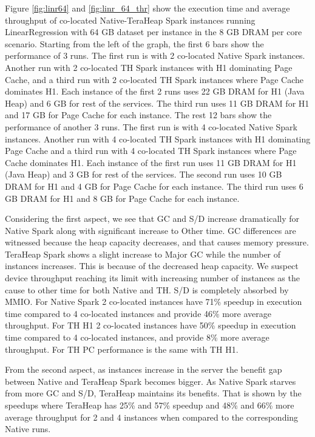 Figure \ref{fig:linr64} and \ref{fig:linr_64_thr} show the execution time and average throughput of co-located
Native-TeraHeap Spark instances running LinearRegression with 64 GB
dataset per instance in the 8 GB DRAM per core scenario.
Starting from the left of the graph, the first 6 bars show the
performance of 3 runs. The first run is with 2 co-located Native Spark instances.
Another run with 2 co-located TH Spark instances with H1 dominating Page Cache,
and a third run with 2 co-located TH Spark instances where Page Cache dominates H1.
Each instance of the first 2 runs uses 22 GB DRAM for H1 (Java Heap) and 6 GB for rest of the services.
The third run uses 11 GB DRAM for H1 and 17 GB for Page Cache for each instance.
The rest 12 bars show the performance of another 3 runs. The first run is with 4 co-located Native Spark instances.
Another run with 4 co-located TH Spark instances with H1 dominating Page Cache
and a third run with 4 co-located TH Spark instances where Page Cache dominates H1.
Each instance of the first run uses 11 GB DRAM for H1 (Java Heap) and 3 GB for rest of the services.
The second run uses 10 GB DRAM for H1 and 4 GB for Page Cache for each instance.
The third run uses 6 GB DRAM for H1 and 8 GB for Page Cache for each instance.

Considering the first aspect, we see that GC and S/D increase dramatically for Native Spark along with significant increase to Other time. GC differences are witnessed because the heap capacity decreases, and that causes memory pressure. TeraHeap Spark shows a slight increase to Major GC while the number of instances increases. This is because of the decreased heap capacity. We suspect device throughput reaching its limit with increasing number of instances as the cause to other time for both Native and TH. S/D is completely absorbed by MMIO. For Native Spark 2 co-located instances have 71\% speedup in execution time compared to 4 co-located instances and provide 46\% more average throughput. For TH H1 2 co-located instances have 50\% speedup in execution time compared to 4 co-located instances, and provide 8\% more average throughput. For TH PC performance is the same with TH H1.

From the second aspect, as instances increase in the server the benefit gap between Native and TeraHeap Spark becomes bigger. As Native Spark starves from more GC and S/D, TeraHeap maintains its benefits. That is shown by the speedups where TeraHeap has 25\% and 57\% speedup and 48\% and 66\% more average throughput for 2 and 4 instances when compared to the corresponding Native runs.

